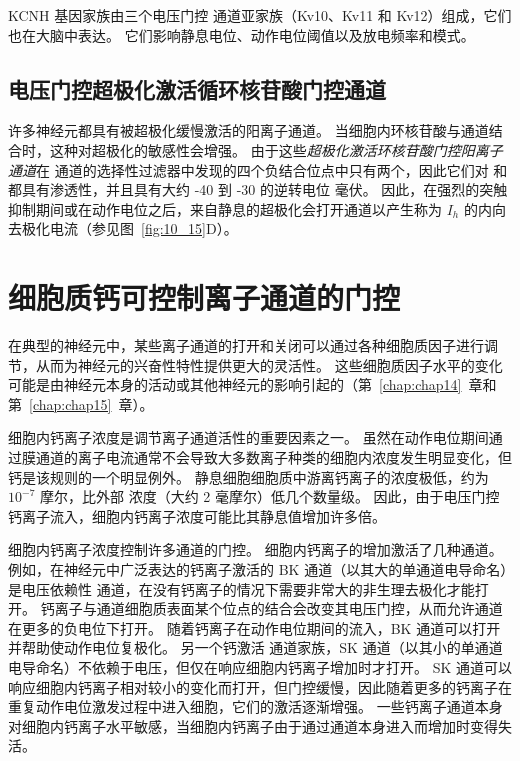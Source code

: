 KCNH 基因家族由三个电压门控  通道亚家族（Kv10、Kv11 和 Kv12）组成，它们也在大脑中表达。
它们影响静息电位、动作电位阈值以及放电频率和模式。



\subsection{电压门控超极化激活循环核苷酸门控通道}

许多神经元都具有被超极化缓慢激活的阳离子通道。
当细胞内环核苷酸与通道结合时，这种对超极化的敏感性会增强。
由于这些\textit{超极化激活环核苷酸门控阳离子通道}在  通道的选择性过滤器中发现的四个负结合位点中只有两个，因此它们对  和  都具有渗透性，并且具有大约 -40 到 -30 的逆转电位 毫伏。
因此，在强烈的突触抑制期间或在动作电位之后，来自静息的超极化会打开通道以产生称为 $I_h$ 的内向去极化电流（参见图~\ref{fig:10_15}D）。



\section{细胞质钙可控制离子通道的门控}

在典型的神经元中，某些离子通道的打开和关闭可以通过各种细胞质因子进行调节，从而为神经元的兴奋性特性提供更大的灵活性。
这些细胞质因子水平的变化可能是由神经元本身的活动或其他神经元的影响引起的（第~\ref{chap:chap14}~章和第~\ref{chap:chap15}~章）。


细胞内钙离子浓度是调节离子通道活性的重要因素之一。
虽然在动作电位期间通过膜通道的离子电流通常不会导致大多数离子种类的细胞内浓度发生明显变化，但钙是该规则的一个明显例外。
静息细胞细胞质中游离钙离子的浓度极低，约为 $10^{-7}$ 摩尔，比外部  浓度（大约 2 毫摩尔）低几个数量级。 
因此，由于电压门控钙离子流入，细胞内钙离子浓度可能比其静息值增加许多倍。


细胞内钙离子浓度控制许多通道的门控。
细胞内钙离子的增加激活了几种通道。
例如，在神经元中广泛表达的钙离子激活的 BK 通道（以其大的单通道电导命名）是电压依赖性  通道，在没有钙离子的情况下需要非常大的非生理去极化才能打开。
钙离子与通道细胞质表面某个位点的结合会改变其电压门控，从而允许通道在更多的负电位下打开。
随着钙离子在动作电位期间的流入，BK 通道可以打开并帮助使动作电位复极化。
另一个钙激活  通道家族，SK 通道（以其小的单通道电导命名）不依赖于电压，但仅在响应细胞内钙离子增加时才打开。
SK 通道可以响应细胞内钙离子相对较小的变化而打开，但门控缓慢，因此随着更多的钙离子在重复动作电位激发过程中进入细胞，它们的激活逐渐增强。
一些钙离子通道本身对细胞内钙离子水平敏感，当细胞内钙离子由于通过通道本身进入而增加时变得失活。


